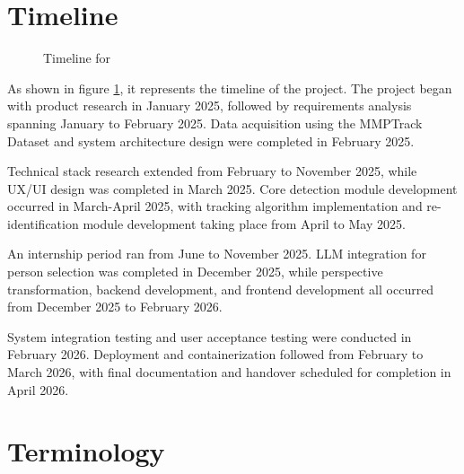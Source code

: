 \section{Timeline}
\label{section:timeline}

\begin{figure}[!htb]
    \centering
    \caption{Timeline for \usevar{\srsTitle}}
    \label{fig:timeline}
\end{figure}
\clearpage
As shown in figure \ref{fig:timeline}, it represents the timeline of the project.
The project began with product research in January 2025, followed by requirements analysis spanning January to February 2025. Data acquisition using the MMPTrack Dataset and system architecture design were completed in February 2025.

Technical stack research extended from February to November 2025, while UX/UI design was completed in March 2025. Core detection module development occurred in March-April 2025, with tracking algorithm implementation and re-identification module development taking place from April to May 2025.

An internship period ran from June to November 2025. LLM integration for person selection was completed in December 2025, while perspective transformation, backend development, and frontend development all occurred from December 2025 to February 2026.

System integration testing and user acceptance testing were conducted in February 2026. Deployment and containerization followed from February to March 2026, with final documentation and handover scheduled for completion in April 2026.


\section{Terminology}
\label{section:terminology}

